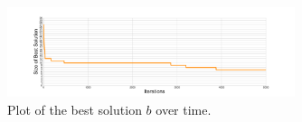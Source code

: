 \documentclass{article}
\begin{document}
\begin{figure}
\centering
\includegraphics[width=0.75\textwidth]{overtime}
\caption{Plot of the best solution $b$ over time.}
\label{fig:overtime}
\end{figure}
\end{document}
